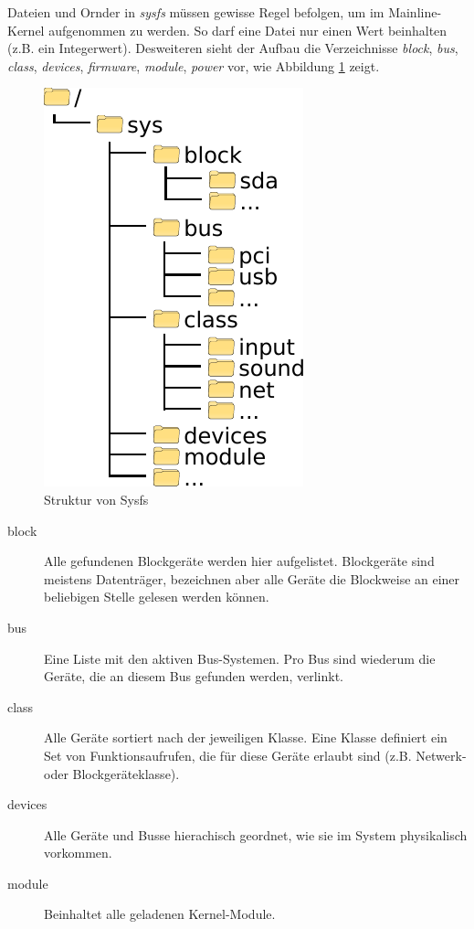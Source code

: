 Dateien und Ornder in \emph{sysfs} müssen gewisse Regel befolgen, um im Mainline-Kernel aufgenommen zu werden. So darf eine Datei nur einen Wert beinhalten (z.B. ein Integerwert).
Desweiteren sieht der Aufbau die Verzeichnisse \emph{block}, \emph{bus}, \emph{class}, \emph{devices}, \emph{firmware}, \emph{module}, \emph{power} vor, wie Abbildung \ref{fig:sysfs}
zeigt.

\begin{figure}[h!]
   \begin{center}
      \includegraphics{images/sysfs}
   \end{center}
   \caption{Struktur von Sysfs}
   \label{fig:sysfs}
\end{figure}

\begin{description}
   \item[block] Alle gefundenen Blockgeräte werden hier aufgelistet. Blockgeräte sind meistens Datenträger, bezeichnen aber alle Geräte die Blockweise an einer beliebigen Stelle gelesen werden können.
   \item[bus] Eine Liste mit den aktiven Bus-Systemen. Pro Bus sind wiederum die Geräte, die an diesem Bus gefunden werden, verlinkt.
   \item[class] Alle Geräte sortiert nach der jeweiligen Klasse. Eine Klasse definiert ein Set von Funktionsaufrufen, die für diese Geräte erlaubt sind (z.B. Netwerk- oder Blockgeräteklasse).
   \item[devices] Alle Geräte und Busse hierachisch geordnet, wie sie im System physikalisch vorkommen.
   \item[module] Beinhaltet alle geladenen Kernel-Module.
\end{description}

